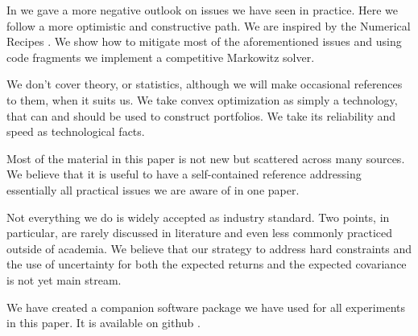 In \cite{schmelzer2013seven} we gave a more
negative outlook on issues
we have seen in practice.
Here we follow a more optimistic and constructive path.
We are inspired by the Numerical Recipes \cite{press1992numerical}.
We show how to mitigate most of the aforementioned issues and
using code fragments we implement a competitive Markowitz solver.

We don't cover theory, or statistics, although we will make occasional references to
them, when it suits us.
We take convex optimization as simply a technology, that can and should be used
to construct portfolios.
We take its reliability and speed as technological facts.






Most of the material in this paper is not new but scattered across many sources.
We believe that it is useful to have a self-contained reference addressing essentially
all practical issues we are aware of in one paper.

Not everything we do is widely accepted as industry standard.
Two points, in particular, are rarely discussed in literature
and even less commonly practiced outside of academia.
We believe that our strategy to address hard constraints
and the use of uncertainty for both the expected returns and the expected covariance
is not yet main stream.

We have created a companion software package we have used for all experiments in
this paper.
It is available on github \cite{cvxmarkowitz}.

